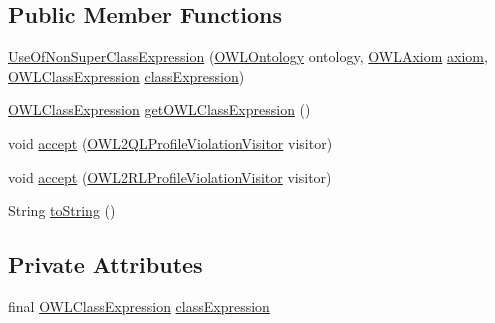 \subsection*{Public Member Functions}
\begin{DoxyCompactItemize}
\item 
\hyperlink{classorg_1_1semanticweb_1_1owlapi_1_1profiles_1_1_use_of_non_super_class_expression_af9dbe5a40e33ce1c5e4249f2599cb7e2}{Use\-Of\-Non\-Super\-Class\-Expression} (\hyperlink{interfaceorg_1_1semanticweb_1_1owlapi_1_1model_1_1_o_w_l_ontology}{O\-W\-L\-Ontology} ontology, \hyperlink{interfaceorg_1_1semanticweb_1_1owlapi_1_1model_1_1_o_w_l_axiom}{O\-W\-L\-Axiom} \hyperlink{classorg_1_1semanticweb_1_1owlapi_1_1profiles_1_1_o_w_l_profile_violation_aa7c8e8910ed3966f64a2c003fb516214}{axiom}, \hyperlink{interfaceorg_1_1semanticweb_1_1owlapi_1_1model_1_1_o_w_l_class_expression}{O\-W\-L\-Class\-Expression} \hyperlink{classorg_1_1semanticweb_1_1owlapi_1_1profiles_1_1_use_of_non_super_class_expression_a35313e1946ed43a5166c82c92af0b097}{class\-Expression})
\item 
\hyperlink{interfaceorg_1_1semanticweb_1_1owlapi_1_1model_1_1_o_w_l_class_expression}{O\-W\-L\-Class\-Expression} \hyperlink{classorg_1_1semanticweb_1_1owlapi_1_1profiles_1_1_use_of_non_super_class_expression_adb85f10db133205780c1df1e846015f1}{get\-O\-W\-L\-Class\-Expression} ()
\item 
void \hyperlink{classorg_1_1semanticweb_1_1owlapi_1_1profiles_1_1_use_of_non_super_class_expression_aded020faab763d40cf94ff4c78ea24fa}{accept} (\hyperlink{interfaceorg_1_1semanticweb_1_1owlapi_1_1profiles_1_1_o_w_l2_q_l_profile_violation_visitor}{O\-W\-L2\-Q\-L\-Profile\-Violation\-Visitor} visitor)
\item 
void \hyperlink{classorg_1_1semanticweb_1_1owlapi_1_1profiles_1_1_use_of_non_super_class_expression_aa43200d8d98d6a60dcbcc32806fb14da}{accept} (\hyperlink{interfaceorg_1_1semanticweb_1_1owlapi_1_1profiles_1_1_o_w_l2_r_l_profile_violation_visitor}{O\-W\-L2\-R\-L\-Profile\-Violation\-Visitor} visitor)
\item 
String \hyperlink{classorg_1_1semanticweb_1_1owlapi_1_1profiles_1_1_use_of_non_super_class_expression_a9e7d2cf9ec6a1fbc2f03b07e8b8e38d4}{to\-String} ()
\end{DoxyCompactItemize}
\subsection*{Private Attributes}
\begin{DoxyCompactItemize}
\item 
final \hyperlink{interfaceorg_1_1semanticweb_1_1owlapi_1_1model_1_1_o_w_l_class_expression}{O\-W\-L\-Class\-Expression} \hyperlink{classorg_1_1semanticweb_1_1owlapi_1_1profiles_1_1_use_of_non_super_class_expression_a35313e1946ed43a5166c82c92af0b097}{class\-Expression}
\end{DoxyCompactItemize}


